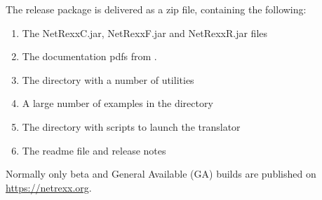 The \nr{} release package is delivered as a zip file, containing the following:
\begin{enumerate}
    \item The NetRexxC.jar, NetRexxF.jar and NetRexxR.jar files
    \item The documentation pdfs from .
    \item The  directory with a number of utilities
    \item A large number of examples in the  directory
    \item The  directory with scripts to launch the translator
    \item The readme file and release notes
\end{enumerate}


Normally only beta and General Available (GA) builds are published on \url{https://netrexx.org}.




